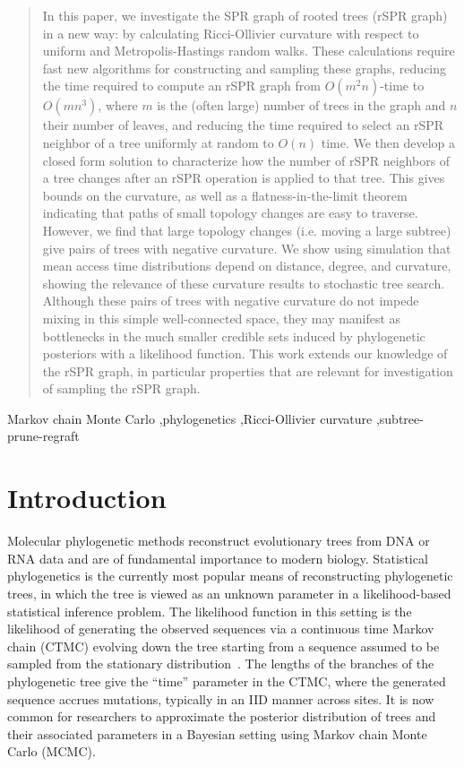 \documentclass[]{elsarticle}
\begin{document}
\begin{frontmatter}
\begin{abstract}
In this paper, we investigate the SPR graph of rooted trees (rSPR graph) in a new way: by calculating Ricci-Ollivier curvature with respect to uniform and Metropolis-Hastings random walks.
These calculations require fast new algorithms for constructing and sampling these graphs, reducing the time required to compute an rSPR graph from $O(m^2n)$-time to $O(mn^3)$, where $m$ is the (often large) number of trees in the graph and $n$ their number of leaves, and reducing the time required to select an rSPR neighbor of a tree uniformly at random to $O(n)$ time.
We then develop a closed form solution to characterize how the number of rSPR neighbors of a tree changes after an rSPR operation is applied to that tree.
This gives bounds on the curvature, as well as a flatness-in-the-limit theorem indicating that paths of small topology changes are easy to traverse.
However, we find that large topology changes (i.e. moving a large subtree) give pairs of trees with negative curvature.
We show using simulation that mean access time distributions depend on distance, degree, and curvature, showing the relevance of these curvature results to stochastic tree search.
Although these pairs of trees with negative curvature do not impede mixing in this simple well-connected space, they may manifest as bottlenecks in the much smaller credible sets induced by phylogenetic posteriors with a likelihood function.
This work extends our knowledge of the rSPR graph, in particular properties that are relevant for investigation of sampling the rSPR graph.
\end{abstract}

\begin{keyword}
Markov chain Monte Carlo \sep phylogenetics \sep Ricci-Ollivier curvature \sep subtree-prune-regraft
\end{keyword}

\end{frontmatter}



\section{Introduction}
Molecular phylogenetic methods reconstruct evolutionary trees from DNA or RNA data and are of fundamental importance to modern biology.
Statistical phylogenetics is the currently most popular means of reconstructing phylogenetic trees, in which the tree is viewed as an unknown parameter in a likelihood-based statistical inference problem.
The likelihood function in this setting is the likelihood of generating the observed sequences via a continuous time Markov chain (CTMC) evolving down the tree starting from a sequence assumed to be sampled from the stationary distribution~\citep{felsenstein1981evolutionary}.
The lengths of the branches of the phylogenetic tree give the ``time'' parameter in the CTMC, where the generated sequence accrues mutations, typically in an IID manner across sites.
It is now common for researchers to approximate the posterior distribution of trees and their associated parameters in a Bayesian setting using Markov chain Monte Carlo (MCMC).
\end{document}

